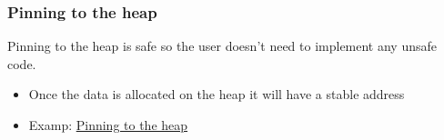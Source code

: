 \begin{frame}[fragile]
    \frametitle{Pinning to the heap}
% 
% 
Pinning to the heap is safe so the user doesn't need to implement any unsafe code.
% 
    \begin{itemize}
        \item Once the data is allocated on the heap it will have a stable address
        \item Examp: \href{https://cfsamson.github.io/books-futures-explained/4_pin.html#pinning-to-the-heap}{Pinning to the heap}
    \end{itemize}

\end{frame}


